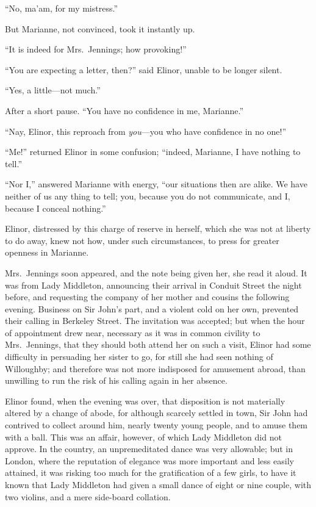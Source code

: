 ``No, ma'am, for my mistress.''

But Marianne, not convinced, took it instantly up.

``It is indeed for Mrs.\ Jennings; how provoking!''

``You are expecting a letter, then?'' said Elinor,
unable to be longer silent.

``Yes, a little---not much.''

After a short pause.  ``You have no confidence
in me, Marianne.''

``Nay, Elinor, this reproach from \emph{you}---you who have
confidence in no one!''

``Me!'' returned Elinor in some confusion; ``indeed,
Marianne, I have nothing to tell.''

``Nor I,'' answered Marianne with energy, ``our situations
then are alike.  We have neither of us any thing to tell;
you, because you do not communicate, and I, because
I conceal nothing.''

Elinor, distressed by this charge of reserve in herself,
which she was not at liberty to do away, knew not how,
under such circumstances, to press for greater openness
in Marianne.

Mrs.\ Jennings soon appeared, and the note being
given her, she read it aloud.  It was from Lady Middleton,
announcing their arrival in Conduit Street the night before,
and requesting the company of her mother and cousins
the following evening.  Business on Sir John's part,
and a violent cold on her own, prevented their calling
in Berkeley Street.  The invitation was accepted;
but when the hour of appointment drew near, necessary as
it was in common civility to Mrs.\ Jennings, that they
should both attend her on such a visit, Elinor had some
difficulty in persuading her sister to go, for still
she had seen nothing of Willoughby; and therefore was
not more indisposed for amusement abroad, than unwilling
to run the risk of his calling again in her absence.

Elinor found, when the evening was over,
that disposition is not materially altered by a change
of abode, for although scarcely settled in town,
Sir John had contrived to collect around him, nearly twenty
young people, and to amuse them with a ball.  This was
an affair, however, of which Lady Middleton did not approve.
In the country, an unpremeditated dance was very allowable;
but in London, where the reputation of elegance was more
important and less easily attained, it was risking too much
for the gratification of a few girls, to have it known that
Lady Middleton had given a small dance of eight or nine couple,
with two violins, and a mere side-board collation.

